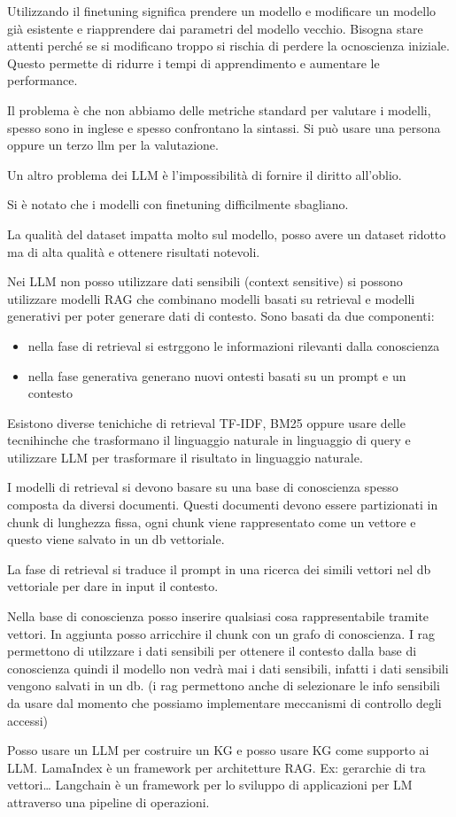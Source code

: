 Utilizzando il finetuning significa prendere un modello e modificare un modello 
già esistente e riapprendere dai parametri del modello vecchio. Bisogna 
stare attenti perché se si modificano troppo si rischia di perdere la ocnoscienza
iniziale. Questo permette di ridurre i tempi di apprendimento e aumentare le 
performance.

Il problema è che non abbiamo delle metriche standard per valutare i modelli,
spesso sono in inglese e spesso confrontano la sintassi. Si può usare una persona 
oppure un terzo llm per la valutazione.

Un altro problema dei LLM è l'impossibilità di fornire il diritto all'oblio.

Si è notato che i modelli con finetuning difficilmente sbagliano.

La qualità del dataset impatta molto sul modello, posso avere un dataset ridotto 
ma di alta qualità e ottenere risultati notevoli.

Nei LLM non posso utilizzare dati sensibili (context sensitive) si possono utilizzare 
modelli RAG che combinano modelli basati su retrieval e modelli generativi 
per poter generare dati di contesto. Sono basati da due componenti:
\begin{itemize}
    \item nella fase di retrieval si estrggono le informazioni rilevanti dalla
    conoscienza
    \item nella fase generativa generano nuovi ontesti basati su un prompt e un 
    contesto
\end{itemize}
Esistono diverse tenichiche di retrieval TF-IDF, BM25 oppure usare delle tecnihinche 
che trasformano il linguaggio naturale in linguaggio di query e utilizzare LLM 
per trasformare il risultato in linguaggio naturale.

I modelli di retrieval si devono basare su una base di conoscienza spesso composta 
da diversi documenti. Questi documenti devono essere partizionati in chunk di 
lunghezza fissa, ogni chunk viene rappresentato come un vettore e questo viene 
salvato in un db vettoriale.

La fase di retrieval si traduce il prompt in una ricerca dei simili vettori nel 
db vettoriale per dare in input il contesto.

Nella base di conoscienza posso inserire qualsiasi cosa rappresentabile tramite 
vettori. In aggiunta posso arricchire il chunk con un grafo di conoscienza. 
I rag permettono di utilzzare i dati sensibili per ottenere il contesto dalla base 
di conoscienza quindi il modello non vedrà mai i dati sensibili, infatti i dati 
sensibili vengono salvati in un db.  (i rag permettono anche di selezionare 
le info sensibili da usare dal momento che possiamo implementare meccanismi di 
controllo degli accessi)

Posso usare un LLM per costruire un KG e posso usare KG come supporto ai LLM.
LamaIndex è un framework per architetture RAG. Ex: gerarchie di tra vettori\dots
Langchain è un framework per lo sviluppo di applicazioni per LM attraverso una 
pipeline di operazioni.